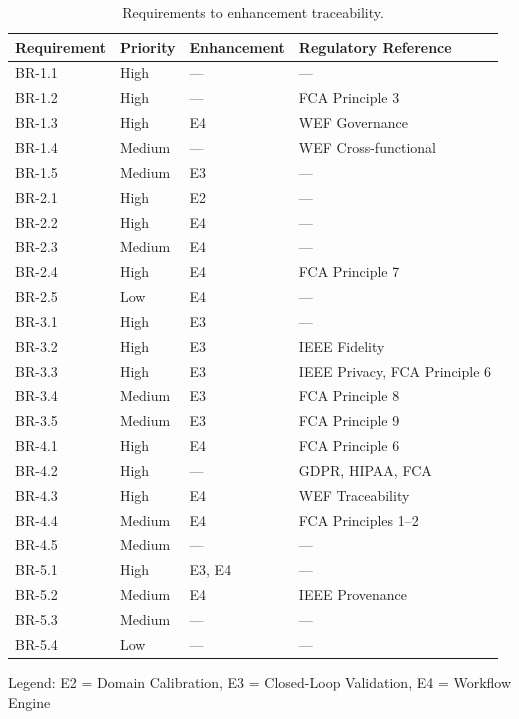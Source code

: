 \begin{table}[htbp]
\centering
\caption{Requirements to enhancement traceability.}
\label{tab:req-traceability}
\scriptsize
\begin{tabularx}{\textwidth}{@{}l l l X@{}}
\toprule
\textbf{Requirement} & \textbf{Priority} & \textbf{Enhancement} & \textbf{Regulatory Reference} \\
\midrule
BR-1.1 & High & --- & --- \\
BR-1.2 & High & --- & FCA Principle 3 \\
BR-1.3 & High & E4 & WEF Governance \\
BR-1.4 & Medium & --- & WEF Cross-functional \\
BR-1.5 & Medium & E3 & --- \\
\midrule
BR-2.1 & High & E2 & --- \\
BR-2.2 & High & E4 & --- \\
BR-2.3 & Medium & E4 & --- \\
BR-2.4 & High & E4 & FCA Principle 7 \\
BR-2.5 & Low & E4 & --- \\
\midrule
BR-3.1 & High & E3 & --- \\
BR-3.2 & High & E3 & IEEE Fidelity \\
BR-3.3 & High & E3 & IEEE Privacy, FCA Principle 6 \\
BR-3.4 & Medium & E3 & FCA Principle 8 \\
BR-3.5 & Medium & E3 & FCA Principle 9 \\
\midrule
BR-4.1 & High & E4 & FCA Principle 6 \\
BR-4.2 & High & --- & GDPR, HIPAA, FCA \\
BR-4.3 & High & E4 & WEF Traceability \\
BR-4.4 & Medium & E4 & FCA Principles 1--2 \\
BR-4.5 & Medium & --- & --- \\
\midrule
BR-5.1 & High & E3, E4 & --- \\
BR-5.2 & Medium & E4 & IEEE Provenance \\
BR-5.3 & Medium & --- & --- \\
BR-5.4 & Low & --- & --- \\
\bottomrule
\end{tabularx}
\end{table}

Legend: E2 = Domain Calibration, E3 = Closed-Loop Validation, E4 = Workflow Engine